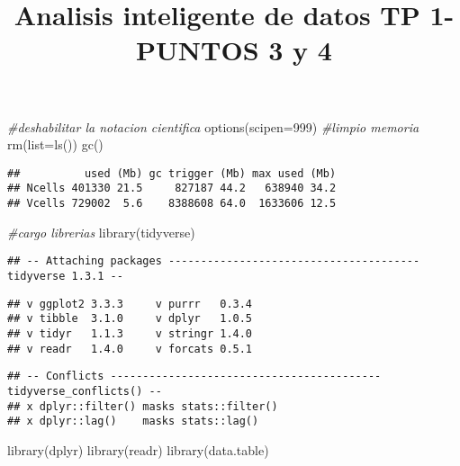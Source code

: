 \documentclass[
]{article}
\title{Analisis inteligente de datos TP 1- PUNTOS 3 y 4}
\author{}
\date{\vspace{-2.5em}}
\newenvironment{Shaded}{\begin{snugshade}}{\end{snugshade}}
\newcommand{\AttributeTok}[1]{\textcolor[rgb]{0.77,0.63,0.00}{#1}}
\newcommand{\CommentTok}[1]{\textcolor[rgb]{0.56,0.35,0.01}{\textit{#1}}}
\newcommand{\DecValTok}[1]{\textcolor[rgb]{0.00,0.00,0.81}{#1}}
\newcommand{\FunctionTok}[1]{\textcolor[rgb]{0.00,0.00,0.00}{#1}}
\newcommand{\NormalTok}[1]{#1}
\begin{document}
\maketitle

\begin{Shaded}
\begin{Highlighting}[]
\CommentTok{\#deshabilitar la notacion cientifica}
\FunctionTok{options}\NormalTok{(}\AttributeTok{scipen=}\DecValTok{999}\NormalTok{)}
\CommentTok{\#limpio memoria}
\FunctionTok{rm}\NormalTok{(}\AttributeTok{list=}\FunctionTok{ls}\NormalTok{())}
\FunctionTok{gc}\NormalTok{()}
\end{Highlighting}
\end{Shaded}

\begin{verbatim}
##          used (Mb) gc trigger (Mb) max used (Mb)
## Ncells 401330 21.5     827187 44.2   638940 34.2
## Vcells 729002  5.6    8388608 64.0  1633606 12.5
\end{verbatim}

\begin{Shaded}
\begin{Highlighting}[]
\CommentTok{\#cargo librerias}
\FunctionTok{library}\NormalTok{(tidyverse)}
\end{Highlighting}
\end{Shaded}

\begin{verbatim}
## -- Attaching packages --------------------------------------- tidyverse 1.3.1 --
\end{verbatim}

\begin{verbatim}
## v ggplot2 3.3.3     v purrr   0.3.4
## v tibble  3.1.0     v dplyr   1.0.5
## v tidyr   1.1.3     v stringr 1.4.0
## v readr   1.4.0     v forcats 0.5.1
\end{verbatim}

\begin{verbatim}
## -- Conflicts ------------------------------------------ tidyverse_conflicts() --
## x dplyr::filter() masks stats::filter()
## x dplyr::lag()    masks stats::lag()
\end{verbatim}

\begin{Shaded}
\begin{Highlighting}[]
\FunctionTok{library}\NormalTok{(dplyr)}
\FunctionTok{library}\NormalTok{(readr)}
\FunctionTok{library}\NormalTok{(data.table)}
\end{Highlighting}
\end{Shaded}
\end{document}
